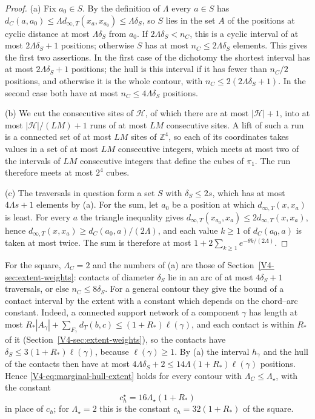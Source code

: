 \documentclass[11pt]{article}
\numberwithin{equation}{section}
\theoremstyle{remark}
\theoremstyle{plain}
\begin{document}
\begin{proof}
(a) Fix $a_0\in S$. By the definition of $\Lambda$ every $a\in S$ has $d_C(a,a_0)\leqslant \Lambda d_{\infty,T}(x_a,x_{a_0})\leqslant \Lambda\delta_S$, so $S$ lies in the set $A$ of the positions at cyclic distance at most $\Lambda\delta_S$ from $a_0$. If $2\Lambda\delta_S< n_C$, this is a cyclic interval of at most $2\Lambda\delta_S+1$ positions; otherwise $S$ has at most $n_C\leqslant 2\Lambda\delta_S$ elements. This gives the first two assertions. In the first case of the dichotomy the shortest interval has at most $2\Lambda\delta_S+1$ positions; the hull is this interval if it has fewer than $n_C/2$ positions, and otherwise it is the whole contour, with $n_C\leqslant 2(2\Lambda\delta_S+1)$. In the second case both have at most $n_C\leqslant 4\Lambda\delta_S$ positions.

(b) We cut the consecutive sites of $\mathcal H$, of which there are at most $|\mathcal H|+1$, into at most $|\mathcal H|/(LM)+1$ runs of at most $LM$ consecutive sites. A lift of such a run is a connected set of at most $LM$ sites of $\mathbb Z^4$, so each of its coordinates takes values in a set of at most $LM$ consecutive integers, which meets at most two of the intervals of $LM$ consecutive integers that define the cubes of $\pi_1$. The run therefore meets at most $2^4$ cubes.

(c) The traversals in question form a set $S$ with $\delta_S\leqslant 2s$, which has at most $4\Lambda s+1$ elements by (a). For the sum, let $a_0$ be a position at which $d_{\infty,T}(x,x_a)$ is least. For every $a$ the triangle inequality gives $d_{\infty,T}(x_{a_0},x_a)\leqslant 2d_{\infty,T}(x,x_a)$, hence $d_{\infty,T}(x,x_a)\geqslant d_C(a_0,a)/(2\Lambda)$, and each value $k\geqslant 1$ of $d_C(a_0,a)$ is taken at most twice. The sum is therefore at most $1+2\sum_{k\geqslant 1}e^{-\theta k/(2\Lambda)}$.
\end{proof}

For the square, $\Lambda_C=2$ and the numbers of (a) are those of Section~\ref{V4-sec:extent-weights}: contacts of diameter $\delta_S$ lie in an arc of at most $4\delta_S+1$ traversals, or else $n_C\leqslant 8\delta_S$. For a general contour they give the bound of a contact interval by the extent with a constant which depends on the chord--arc constant. Indeed, a connected support network of a component $\gamma$ has length at most $R_*| A_{\gamma}|+\sum_{F_{\gamma}}d_T(b,c)\leqslant (1+R_*)\ell(\gamma)$, and each contact is within $R_*$ of it (Section~\ref{V4-sec:extent-weights}), so the contacts have $\delta_S\leqslant 3(1+R_*)\ell(\gamma)$, because $\ell(\gamma)\geqslant 1$. By (a) the interval $h_{\gamma}$ and the hull of the contacts then have at most $4\Lambda\delta_S+2\leqslant 14\Lambda(1+R_*)\ell(\gamma)$ positions. Hence \eqref{V4-eq:marginal-hull-extent} holds for every contour with $\Lambda_C\leqslant \Lambda_{\star}$, with the constant
\begin{equation}\label{eq:torus-hull-constant}
    c_h^{\star}=16\Lambda_{\star}(1+R_*)
\end{equation}
in place of $c_h$; for $\Lambda_{\star}=2$ this is the constant $c_h=32(1+R_*)$ of the square.
\end{document}
